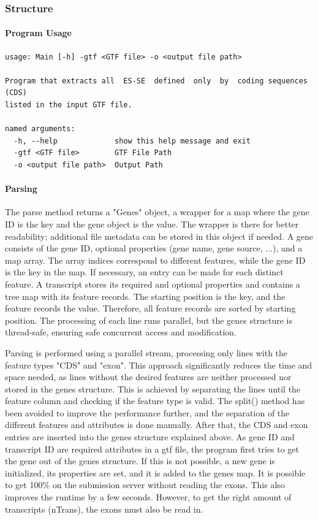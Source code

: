 \documentclass{article}
\begin{document}
    \subsubsection{Structure}

    \paragraph{Program Usage}
    \begin{verbatim}
usage: Main [-h] -gtf <GTF file> -o <output file path>

Program that extracts all  ES-SE  defined  only  by  coding sequences (CDS)
listed in the input GTF file.

named arguments:
  -h, --help             show this help message and exit
  -gtf <GTF file>        GTF File Path
  -o <output file path>  Output Path
    \end{verbatim}

    \paragraph{Parsing}
    The parse method returns a "Genes" object, a wrapper for a map where the gene ID is the key and the gene object is the value. The wrapper is there for better readability; additional file metadata can be stored in this object if needed. A gene consists of the gene ID, optional properties (gene name, gene source, ...), and a map array. The array indices correspond to different features, while the gene ID is the key in the map. If necessary, an entry can be made for each distinct feature. A transcript stores its required and optional properties and contains a tree map with its feature records. The starting position is the key, and the feature records the value. Therefore, all feature records are sorted by starting position. The processing of each line runs parallel, but the genes structure is thread-safe, ensuring safe concurrent access and modification.

    Parsing is performed using a parallel stream, processing only lines with the feature types "CDS" and "exon". This approach significantly reduces the time and space needed, as lines without the desired features are neither processed nor stored in the genes structure. This is achieved by separating the lines until the feature column and checking if the feature type is valid. The split() method has been avoided to improve the performance further, and the separation of the different features and attributes is done manually. After that, the CDS and exon entries are inserted into the genes structure explained above. As gene ID and transcript ID are required attributes in a gtf file, the program first tries to get the gene out of the genes structure. If this is not possible, a new gene is initialized, its properties are set, and it is added to the genes map. It is possible to get 100\% on the submission server without reading the exons. This also improves the runtime by a few seconds. However, to get the right amount of transcripts (nTrans), the exons must also be read in.
\end{document}
